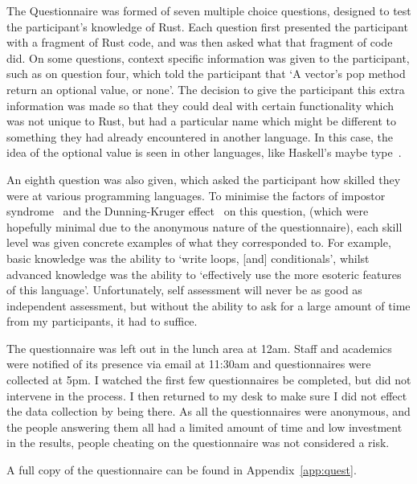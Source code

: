 The Questionnaire was formed of seven multiple choice questions, designed to test the participant's knowledge of Rust. Each question first presented the participant with a fragment of Rust code, and was then asked what that fragment of code did. On some questions, context specific information was given to the participant, such as on question four, which told the participant that `A vector's pop method return an optional value, or none'. The decision to give the participant this extra information was made so that they could deal with certain functionality which was not unique to Rust, but had a particular name which might be different to something they had already encountered in another language. In this case, the idea of the optional value is seen in other languages, like Haskell's maybe type~\cite{HaskellMaybe}.

An eighth question was also given, which asked the participant how skilled they were at various programming languages.
To minimise the factors of impostor syndrome~\cite{langford1993} and the Dunning-Kruger effect~\cite{kruger1999} on this question, (which were hopefully minimal due to the anonymous nature of the questionnaire), each skill level was given concrete examples of what they corresponded to. For example, basic knowledge was the ability to `write loops, [and] conditionals', whilst advanced knowledge was the ability to `effectively use the more esoteric features of this language'. Unfortunately, self assessment will never be as good as independent assessment, but without the ability to ask for a large amount of time from my participants, it had to suffice.

The questionnaire was left out in the lunch area at 12am. Staff and academics were notified of its presence via email at 11:30am and questionnaires were collected at 5pm. I watched the first few questionnaires be completed, but did not intervene in the process. I then returned to my desk to make sure I did not effect the data collection by being there. As all the questionnaires were anonymous, and the people answering them all had a limited amount of time and low investment in the results, people cheating on the questionnaire was not considered a risk. 

A full copy of the questionnaire can be found in Appendix~\ref{app:quest}.
